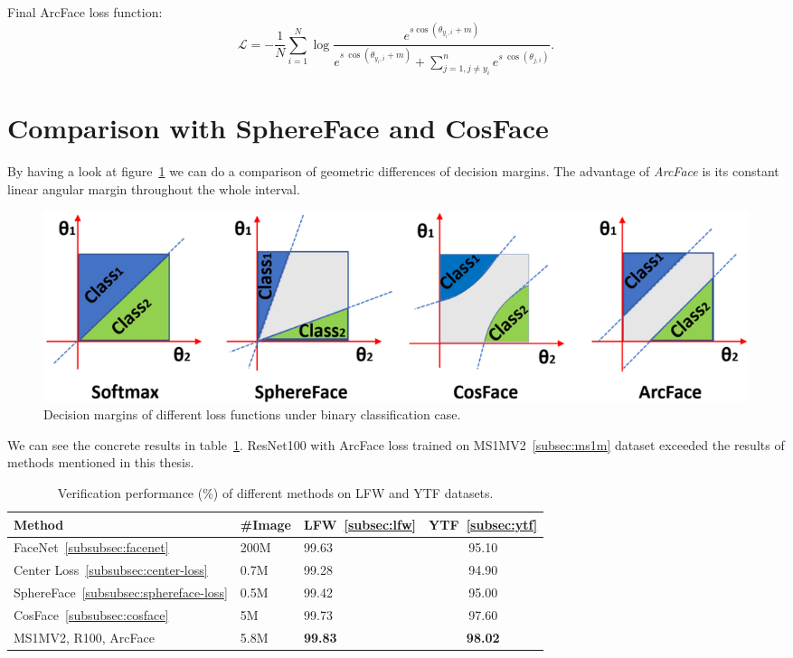 Final ArcFace loss function:
\begin{equation}
    \mathcal{L} = -\frac{1}{N} \sum_{i=1}^{N} \log \frac{e^{s \cos(\theta_{y_i,i} + m)}}
    {e^{s\ \cos(\theta_{y_i,i} + m)} + \sum_{j = 1, j \neq y_i}^n e^{s\ \cos(\theta_{j,i})}}.
\end{equation}

\section{Comparison with SphereFace and CosFace}\label{sec:arc-comparison}
By having a look at figure~\ref{fig:arcfacecomp} we can do a comparison of geometric differences of decision margins.
The advantage of \textit{ArcFace} is its constant linear angular margin throughout the whole interval.

\begin{figure}[H]
    \centering
    \includegraphics[width=\columnwidth]{images/arcface/arcfacecomparison.png}
    \caption{Decision margins of different loss functions under binary classification case.~\cite{ArcFace}}
    \label{fig:arcfacecomp}
\end{figure}

We can see the concrete results in table~\ref{tbl:arcfacecomp}.
ResNet100 with ArcFace loss trained on MS1MV2~\ref{subsec:ms1m} dataset exceeded the results of methods mentioned in
this thesis.

\begin{table}[H]
    \begin{tabularx}{\textwidth}{l|XXc}
        Method                & \#Image & LFW~\ref{subsec:lfw}            & YTF~\ref{subsec:ytf}            \\ \hline
        FaceNet~\ref{subsubsec:facenet}               & 200M    & 99.63          & 95.10          \\
        Center Loss~\ref{subsubsec:center-loss}           & 0.7M    & 99.28          & 94.90          \\
        SphereFace~\ref{subsubsec:sphereface-loss}            & 0.5M    & 99.42          & 95.00          \\
        CosFace~\ref{subsubsec:cosface}               & 5M      & 99.73          & 97.60          \\
        MS1MV2, R100, ArcFace & 5.8M    & \textbf{99.83} & \textbf{98.02}
    \end{tabularx}
    \caption{Verification performance (\%) of different methods on LFW and YTF datasets.}
    \label{tbl:arcfacecomp}
\end{table}
